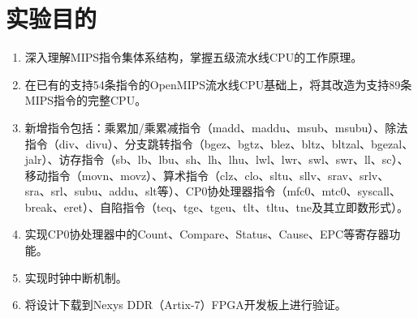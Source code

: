 \section{实验目的}

\begin{enumerate}[leftmargin=2em]
    \item 深入理解MIPS指令集体系结构，掌握五级流水线CPU的工作原理。
    \item 在已有的支持54条指令的OpenMIPS流水线CPU基础上，将其改造为支持89条MIPS指令的完整CPU。
    \item 新增指令包括：乘累加/乘累减指令（madd、maddu、msub、msubu）、除法指令（div、divu）、分支跳转指令（bgez、bgtz、blez、bltz、bltzal、bgezal、jalr）、访存指令（sb、lb、lbu、sh、lh、lhu、lwl、lwr、swl、swr、ll、sc）、移动指令（movn、movz）、算术指令（clz、clo、sltu、sllv、srav、srlv、sra、srl、subu、addu、slt等）、CP0协处理器指令（mfc0、mtc0、syscall、break、eret）、自陷指令（teq、tge、tgeu、tlt、tltu、tne及其立即数形式）。
    \item 实现CP0协处理器中的Count、Compare、Status、Cause、EPC等寄存器功能。
    \item 实现时钟中断机制。
    \item 将设计下载到Nexys DDR（Artix-7）FPGA开发板上进行验证。
\end{enumerate}
